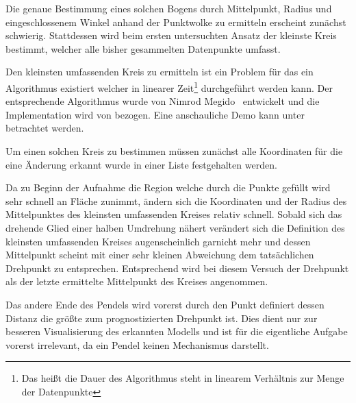 Die genaue Bestimmung eines solchen Bogens durch Mittelpunkt, Radius und eingeschlossenem Winkel anhand der Punktwolke zu ermitteln erscheint zunächst schwierig.
Stattdessen wird beim ersten untersuchten Ansatz der kleinste Kreis bestimmt, welcher alle bisher gesammelten Datenpunkte umfasst.

Den kleinsten umfassenden Kreis zu ermitteln ist ein Problem für das ein Algorithmus existiert welcher in linearer Zeit\footnote{Das hei{\ss}t die Dauer des Algorithmus steht in linearem Verhältnis zur Menge der Datenpunkte} durchgeführt werden kann.
Der entsprechende Algorithmus wurde von Nimrod Megido~\cite{Megiddo1983} entwickelt und die Implementation wird von  bezogen.
Eine anschauliche Demo kann unter ~\cite{Nayuki2021} betrachtet werden.


Um einen solchen Kreis zu bestimmen müssen zunächst alle Koordinaten für die eine Änderung erkannt wurde in einer Liste festgehalten werden.

Da zu Beginn der Aufnahme die Region welche durch die Punkte gefüllt wird sehr schnell an Fläche zunimmt, ändern sich die Koordinaten und der Radius des Mittelpunktes des kleinsten umfassenden Kreises relativ schnell.
Sobald sich das drehende Glied einer halben Umdrehung nähert verändert sich die Definition des kleinsten umfassenden Kreises augenscheinlich garnicht mehr und dessen Mittelpunkt scheint mit einer sehr kleinen Abweichung dem tatsächlichen Drehpunkt zu entsprechen.
Entsprechend wird bei diesem Versuch der Drehpunkt als der letzte ermittelte Mittelpunkt des Kreises angenommen.

Das andere Ende des Pendels wird vorerst durch den Punkt definiert dessen Distanz die grö{\ss}te zum prognostizierten Drehpunkt ist.
Dies dient nur zur besseren Visualisierung des erkannten Modells und ist für die eigentliche Aufgabe vorerst irrelevant, da ein Pendel keinen Mechanismus darstellt.

